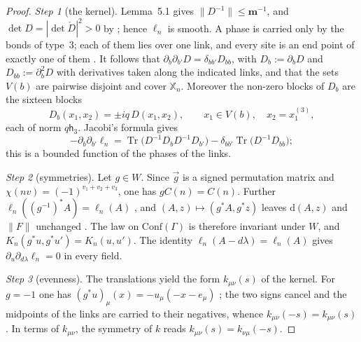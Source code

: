 \documentclass[11pt]{amsart}
\theoremstyle{definition}
\begin{document}
\begin{proof}
\emph{Step 1} (the kernel).
Lemma~5.1 gives $\|D^{-1}\|\le\mathbf m^{-1}$, and $\det D=|\det\check D|^2>0$ by \cite[Proposition~3.18\,(d)]{QEDII}; hence $\ell_n$ is smooth.
A phase is carried only by the bonds of type~$3$; each of them lies over one link, and every site is an end point of exactly one of them \cite[Proposition~3.6\,(c), (d)]{QEDII}.
It follows that $\partial_b\partial_{b'}D=\delta_{bb'}D_{bb}$, with $D_b:=\partial_bD$ and $D_{bb}:=\partial_b^2D$ with derivatives taken along the indicated links, and that the sets $V(b)$ are pairwise disjoint and cover $\mathbb X_n$.
Moreover the non-zero blocks of $D_b$ are the sixteen blocks
\begin{equation*}
D_b(x_1,x_2)=\pm iq\,D(x_1,x_2),\qquad x_1\in V(b),\quad x_2=x_1^{(3)},
\end{equation*}
each of norm $q\mathsf h_3$.
Jacobi's formula gives
\begin{equation*}
-\partial_b\partial_{b'}\ell_n=\operatorname{Tr}\bigl(D^{-1}D_bD^{-1}D_{b'}\bigr)-\delta_{bb'}\operatorname{Tr}\bigl(D^{-1}D_{bb}\bigr);
\end{equation*}
this is a bounded function of the phases of the links.

\emph{Step 2} (symmetries).
Let $g\in W$.
Since $\vec g$ is a signed permutation matrix and $\chi(nv)=(-1)^{v_1+v_2+v_3}$, one has $gC(n)=C(n)$.
Further $\ell_n((g^{-1})^*A)=\ell_n(A)$ \cite[Proposition~3.16\,(b)]{QEDII}, and $(A,z)\mapsto(g^*A,g^*z)$ leaves $\mathrm d(A,z)$ and $\|F\|$ unchanged \cite[Definition~2.6]{QEDII}.
The law on $\mathrm{Conf}(\Gamma)$ is therefore invariant under $W$, and $K_n(g^*u,g^*u')=K_n(u,u')$.
The identity $\ell_n(A-d\lambda)=\ell_n(A)$ \cite[Proposition~3.16\,(a)]{QEDII} gives $\partial_u\partial_{d\lambda}\ell_n=0$ in every field.

\emph{Step 3} (evenness).
The translations yield the form $k_{\mu\nu}(s)$ of the kernel.
For $g=-1$ one has $(g^*u)_\mu(x)=-u_\mu(-x-e_\mu)$ \cite[Definition~2.1]{QEDII}; the two signs cancel and the midpoints of the links are carried to their negatives, whence $k_{\mu\nu}(-s)=k_{\mu\nu}(s)$.
In terms of $k_{\mu\nu}$, the symmetry of $k$ reads $k_{\mu\nu}(s)=k_{\nu\mu}(-s)$.


\end{proof}
\end{document}
